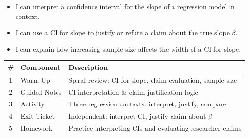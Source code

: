 \documentclass[10pt]{article}
\begin{document}

\vspace{2.4cm}
\namedateperiod

\begin{learningtargetbox}
\begin{itemize}
    \item I can interpret a confidence interval for the slope of a regression model in context.
    \item I can use a CI for slope to justify or refute a claim about the true slope $\beta$.
    \item I can explain how increasing sample size affects the width of a CI for slope.
\end{itemize}
\end{learningtargetbox}

\begin{tocbox}
\renewcommand{\arraystretch}{1.5}
\begin{tabularx}{\linewidth}{clX}
    \textbf{\#} & \textbf{Component} & \textbf{Description} \\
    \hline
    1 & Warm-Up      & Spiral review: CI for slope, claim evaluation, sample size \\
    2 & Guided Notes & CI interpretation \& claim-justification logic \\
    3 & Activity     & Three regression contexts: interpret, justify, compare \\
    4 & Exit Ticket  & Independent: interpret CI, justify claim about $\beta$ \\
    5 & Homework     & Practice interpreting CIs and evaluating researcher claims \\
\end{tabularx}
\end{tocbox}
\end{document}
